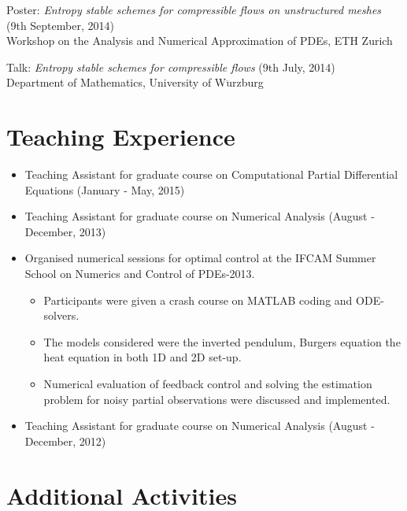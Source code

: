 \documentclass[margin]{res}
\begin{document}
\begin{resume}
              Poster: {\it Entropy stable schemes for compressible flows on unstructured meshes} (9th September, 2014)\\
               Workshop on the Analysis and Numerical Approximation of PDEs, ETH Zurich
              
              Talk: {\it Entropy stable schemes for compressible flows} (9th July, 2014)\\
               Department of Mathematics, University of W$\ddot{\text{u}}$rzburg
              
\section{Teaching Experience} 
   
               \begin{itemize} \itemsep -2pt
               \item Teaching Assistant for graduate course on Computational Partial Differential Equations (January - May, 2015)
               \item Teaching Assistant for graduate course on Numerical Analysis (August - December, 2013)
               \item Organised numerical sessions for optimal control at the IFCAM Summer School on Numerics and Control of PDEs-2013. 
               \begin{itemize}
                 \item Participants were given a crash course on MATLAB coding and ODE-solvers.
                 \item The models considered were the inverted pendulum,  Burgers equation the heat equation in both 1D and 2D set-up.
                 \item Numerical evaluation of feedback control and solving the estimation problem for noisy partial observations were discussed and implemented.
               \end{itemize}
               \item Teaching Assistant for graduate course on Numerical Analysis  (August - December, 2012)
               \end{itemize}              

\section{Additional Activities} 
   

\end{resume}
\end{document}
